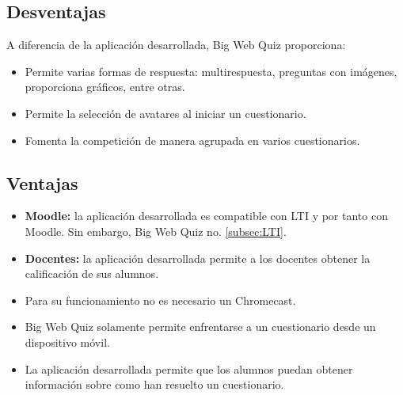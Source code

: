 \subsection{Desventajas}

A diferencia de la aplicación desarrollada, Big Web Quiz proporciona:
	\begin{itemize}
	\item Permite varias formas de respuesta: multirespuesta, preguntas con imágenes, proporciona gráficos, entre otras.
	
	\item Permite la selección de avatares al iniciar un cuestionario.
	
	\item Fomenta la competición de manera agrupada en varios cuestionarios.
	
	\end{itemize}
	
	

\subsection{Ventajas}

\begin{itemize}
	\item \textbf{Moodle:} la aplicación desarrollada es compatible con LTI y por tanto con Moodle. Sin embargo, Big Web Quiz no. \ref{subsec:LTI}.
	
	\item \textbf{Docentes:} la aplicación desarrollada permite a los docentes obtener la calificación de sus alumnos.
	
	\item Para su funcionamiento no es necesario un Chromecast.
	
	\item Big Web Quiz solamente permite enfrentarse a un cuestionario desde un dispositivo móvil.
	
	\item La aplicación desarrollada permite que los alumnos puedan obtener información sobre como han resuelto un cuestionario.
\end{itemize}




